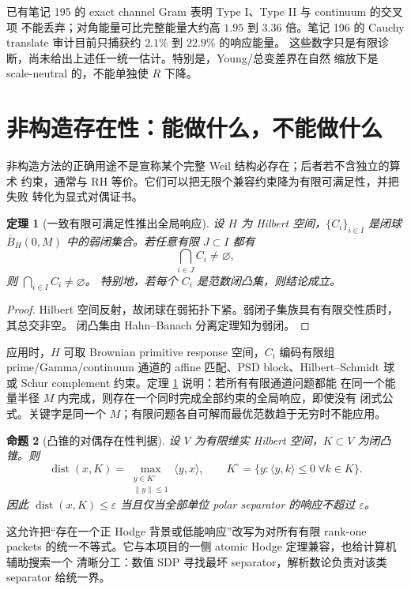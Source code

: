 \documentclass[UTF8,11pt,a4paper]{ctexart}
\newtheorem{theorem}{定理}[section]
\newtheorem{proposition}[theorem]{命题}
\theoremstyle{definition}
\theoremstyle{remark}
\newcommand{\eps}{\varepsilon}
\begin{document}
已有笔记 195 的 exact channel Gram 表明 Type I、Type II 与 continuum 的交叉项
不能丢弃；对角能量可比完整能量大约高 $1.95$ 到 $3.36$ 倍。笔记 196 的
Cauchy translate 审计目前只捕获约 $2.1\%$ 到 $22.9\%$ 的响应能量。
这些数字只是有限诊断，尚未给出上述任一统一估计。特别是，Young/总变差界在自然
缩放下是 scale-neutral 的，不能单独使 $R$ 下降。

\section{非构造存在性：能做什么，不能做什么}

非构造方法的正确用途不是宣称某个完整 Weil 结构必存在；后者若不含独立的算术
约束，通常与 RH 等价。它们可以把无限个兼容约束降为有限可满足性，并把失败
转化为显式对偶证书。

\begin{theorem}[一致有限可满足性推出全局响应]\label{thm:compact}
设 $H$ 为 Hilbert 空间，$\{C_i\}_{i\in I}$ 是闭球
$\overline B_H(0,M)$ 中的弱闭集合。若任意有限 $J\subset I$ 都有
\[
 \bigcap_{i\in J}C_i\ne\varnothing,
\]
则 $\bigcap_{i\in I}C_i\ne\varnothing$。
特别地，若每个 $C_i$ 是范数闭凸集，则结论成立。
\end{theorem}

\begin{proof}
Hilbert 空间反射，故闭球在弱拓扑下紧。弱闭子集族具有有限交性质时，其总交非空。
闭凸集由 Hahn--Banach 分离定理知为弱闭。
\end{proof}

应用时，$H$ 可取 Brownian primitive response 空间，$C_i$ 编码有限组
prime/Gamma/continuum 通道的 affine 匹配、PSD block、Hilbert--Schmidt 球或
Schur complement 约束。定理 \ref{thm:compact} 说明：若所有有限通道问题都能
在同一个能量半径 $M$ 内完成，则存在一个同时完成全部约束的全局响应，即使没有
闭式公式。关键字是同一个 $M$；有限问题各自可解而最优范数趋于无穷时不能应用。

\begin{proposition}[凸锥的对偶存在性判据]\label{prop:dual}
设 $V$ 为有限维实 Hilbert 空间，$K\subset V$ 为闭凸锥。则
\[
 \operatorname{dist}(x,K)
 =\max_{\substack{y\in K^\circ\\\|y\|\le1}}\langle y,x\rangle,
 \qquad
 K^\circ=\{y:\langle y,k\rangle\le0\ \forall k\in K\}.
\]
因此 $\operatorname{dist}(x,K)\le\eps$ 当且仅当全部单位 polar separator
的响应不超过 $\eps$。
\end{proposition}

这允许把“存在一个正 Hodge 背景或低能响应”改写为对所有有限 rank-one packets
的统一不等式。它与本项目的一侧 atomic Hodge 定理兼容，也给计算机辅助搜索一个
清晰分工：数值 SDP 寻找最坏 separator，解析数论负责对该类 separator 给统一界。
\end{document}
